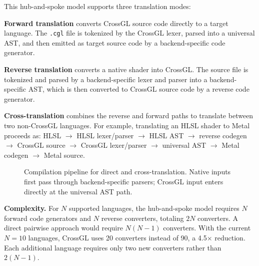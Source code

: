 \documentclass{svproc}
\begin{document}
This hub-and-spoke model supports three translation modes:

\textbf{Forward translation} converts CrossGL source code directly to a target language. The \texttt{.cgl} file is tokenized by the CrossGL lexer, parsed into a universal AST, and then emitted as target source code by a backend-specific code generator.

\textbf{Reverse translation} converts a native shader into CrossGL. The source file is tokenized and parsed by a backend-specific lexer and parser into a backend-specific AST, which is then converted to CrossGL source code by a reverse code generator.

\textbf{Cross-translation} combines the reverse and forward paths to translate between two non-CrossGL languages. For example, translating an HLSL shader to Metal proceeds as: HLSL $\rightarrow$ HLSL lexer/parser $\rightarrow$ HLSL AST $\rightarrow$ reverse codegen $\rightarrow$ CrossGL source $\rightarrow$ CrossGL lexer/parser $\rightarrow$ universal AST $\rightarrow$ Metal codegen $\rightarrow$ Metal source.

\begin{figure}
\centering
{}
\caption{Compilation pipeline for direct and cross-translation. Native inputs first pass through backend-specific parsers; CrossGL input enters directly at the universal AST path.}
\label{fig:pipeline}
\end{figure}

\textbf{Complexity.} For $N$ supported languages, the hub-and-spoke model requires $N$ forward code generators and $N$ reverse converters, totaling $2N$ converters. A direct pairwise approach would require $N(N-1)$ converters. With the current $N=10$ languages, CrossGL uses 20 converters instead of 90, a 4.5$\times$ reduction. Each additional language requires only two new converters rather than $2(N-1)$.
\end{document}
